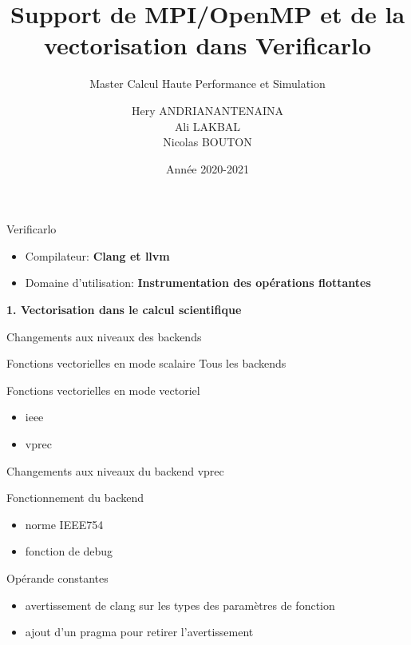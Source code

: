 \documentclass{beamer}
\title[Support pour Verificarlo]{Support de MPI/OpenMP et de la vectorisation dans Verificarlo}
\subtitle{Master Calcul Haute Performance et Simulation}
\author[Hery, Ali, Nicolas]{Hery ANDRIANANTENAINA \\ Ali LAKBAL \\ Nicolas BOUTON}
\institute{\textbf{Encadrant:} Eric PETIT}
\date{Année 2020-2021}
\begin{document}
\maketitle

\begin{frame}{Verificarlo}

  \begin{itemize}
  \item Compilateur: \textbf{ Clang et llvm} 
  \item Domaine d'utilisation: \textbf{ Instrumentation des opérations flottantes}
  \end{itemize}
  
  \textbf{1. Vectorisation dans le calcul scientifique}
  
\end{frame}

\begin{frame}{Changements aux niveaux des backends}

  \begin{block}{Fonctions vectorielles en mode scalaire}
    Tous les backends
  \end{block}

  \begin{block}{Fonctions vectorielles en mode vectoriel}
    \begin{itemize}
    \item ieee
    \item vprec
    \end{itemize}
  \end{block}

\end{frame}

\begin{frame}{Changements aux niveaux du backend vprec}

  \begin{block}{Fonctionnement du backend}
    \begin{itemize}
    \item norme IEEE754
    \item fonction de debug
    \end{itemize}
  \end{block}

  \begin{block}{Opérande constantes}
    \begin{itemize}
    \item avertissement de clang sur les types des paramètres de fonction
    \item ajout d'un pragma pour retirer l'avertissement
    \end{itemize}
  \end{block}

\end{frame}
\end{document}
